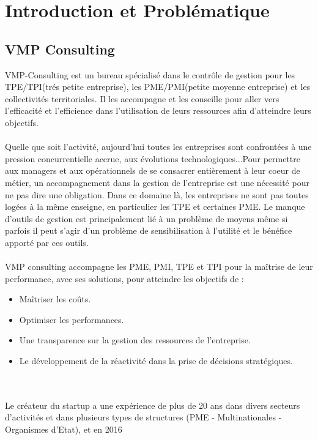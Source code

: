 \documentclass[12pt]{article}
\begin{document}
\newpage

\tableofcontents
\newpage



\section{Introduction et Problématique}

\subsection{VMP Consulting}
VMP-Consulting est un bureau spécialisé dans le contrôle de gestion pour les TPE/TPI(trés petite entreprise), les PME/PMI(petite moyenne entreprise) et les collectivités territoriales. Il les accompagne et les conseille pour aller vers l'efficacité et l'efficience dans l'utilisation de leurs ressources afin d'atteindre leurs objectifs.\\ \\

Quelle que soit l’activité, aujourd’hui toutes les entreprises sont confrontées à une pression concurrentielle accrue, aux évolutions technologiques...Pour permettre aux managers et aux opérationnels de se consacrer entièrement à leur coeur de métier, un accompagnement dans la gestion de l'entreprise est une nécessité pour ne pas dire une obligation. Dans ce domaine là, les entreprises ne sont pas toutes logées à la même enseigne, en particulier les TPE et certaines PME. Le manque d’outils de gestion est principalement lié à un problème de moyens même si parfois il peut s’agir d’un problème de sensibilisation à l’utilité et le bénéfice apporté par ces outils.\\ \\
VMP consulting accompagne les PME, PMI, TPE et TPI pour la maîtrise de leur performance, avec ses solutions, pour atteindre les objectifs de :
\begin{itemize}

\item Maîtriser les coûts.

\item Optimiser les performances.

\item Une transparence sur la gestion des ressources de  l'entreprise.

\item Le développement de la réactivité dans la prise de décisions stratégiques.
\end{itemize}
\\ \\ 
Le créateur du startup a une expérience de plus de 20 ans dans divers secteurs d'activités et dans plusieurs types de structures (PME - Multinationales - Organismes d'Etat), et en 2016 
\end{document}
